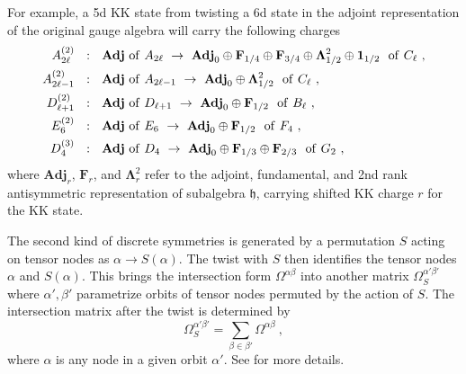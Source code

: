 For example, a 5d KK state from twisting a 6d state in the adjoint representation of the original gauge algebra will carry the following charges \cite{Kac:1990gs}
\begin{align}
	A_{2\ell}^{(2)}	\ \ &: \ \ {\bf Adj} \ {\rm of} \ A_{2\ell} \ \rightarrow \ {\bf Adj}_0\oplus {\bf F}_{1/4}\oplus {\bf F}_{3/4} \oplus {\bf \Lambda}^2_{1/2} \oplus {\bf 1}_{1/2} \ \ {\rm of} \  C_{\ell} \ ,\nonumber \\
	A_{2\ell-1}^{(2)} \ \ &:  \ \ {\bf Adj} \ {\rm of} \  A_{2\ell-1} \ \rightarrow \ {\bf Adj}_0 \oplus {\bf \Lambda}^2_{1/2}  \ \ {\rm of} \  C_{\ell} \ , \nonumber \\
	D_{\ell+1}^{(2)} \ \ &:  \ \ {\bf Adj} \ {\rm of} \  D_{\ell+1} \ \rightarrow \ {\bf Adj}_0 \oplus {\bf F}_{1/2} \ \ {\rm of} \ B_\ell \ , \nonumber \\
	E_6^{(2)} \ \ &:  \ \ {\bf Adj} \ {\rm of} \  E_6 \ \rightarrow \ {\bf Adj}_0\oplus{\bf F}_{1/2}  \ \ {\rm of} \ F_4 \ , \nonumber \\
	D_{4}^{(3)} \ \ &:  \ \ {\bf Adj} \ {\rm of} \  D_4 \ \rightarrow \  {\bf Adj}_0 \oplus{\bf F}_{1/3} \oplus {\bf F}_{2/3} \ \ {\rm of} \ G_2 \ ,
\end{align}
where $\mathbf{Adj}_r$, $\mathbf{F}_r$, and $\mathbf{\Lambda}^2_r$ refer to the adjoint, fundamental, and 2nd rank antisymmetric representation of subalgebra $\mathfrak{h}$, carrying shifted KK charge $r$ for the KK state.

The second kind of discrete symmetries is generated by a permutation $S$ acting on tensor nodes as $\alpha \rightarrow S(\alpha)$. The twist with $S$ then identifies the tensor nodes $\alpha$ and $S(\alpha)$. This brings the intersection form $\Omega^{\alpha\beta}$ into another matrix $\Omega_S^{\alpha'\beta'}$ where $\alpha',\beta'$ parametrize orbits of tensor nodes permuted by the action of $S$. The intersection matrix after the twist is determined by 
\begin{equation}
	\Omega_S^{\alpha'\beta'} = \sum_{\beta\in \beta'}\Omega^{\alpha\beta} \ ,
\end{equation}
where $\alpha$ is any node in a given orbit $\alpha'$. See \cite{Bhardwaj:2019fzv} for more details.

